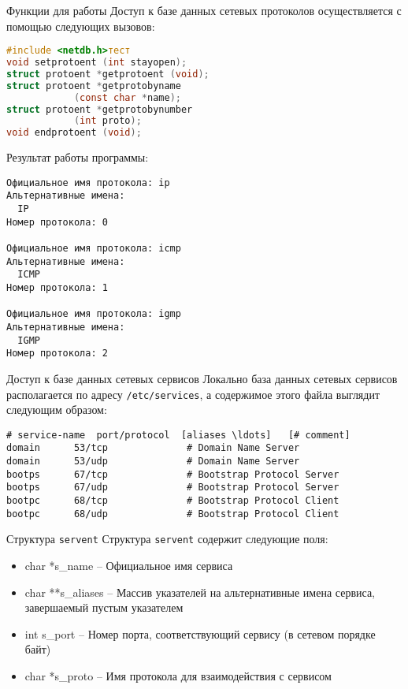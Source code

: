 \begin{frame}[fragile]{Функции для работы}
Доступ к базе данных сетевых протоколов осуществляется с помощью следующих вызовов:
\scriptsize\begin{lstlisting}[language=C]
#include <netdb.h>тест
void setprotoent (int stayopen);
struct protoent *getprotoent (void);
struct protoent *getprotobyname 
            (const char *name);
struct protoent *getprotobynumber
			(int proto);
void endprotoent (void);
\end{lstlisting}
\end{frame}

\begin{frame}[fragile]
\tiny
\end{frame}

\begin{frame}[fragile]{}
Результат работы программы:
\scriptsize\begin{verbatim}
Официальное имя протокола: ip
Альтернативные имена:
  IP
Номер протокола: 0

Официальное имя протокола: icmp
Альтернативные имена:
  ICMP
Номер протокола: 1

Официальное имя протокола: igmp
Альтернативные имена:
  IGMP
Номер протокола: 2
\end{verbatim}
\normalsize
\end{frame}

\begin{frame}[fragile]{Доступ к базе данных сетевых сервисов}
Локально база данных сетевых сервисов располагается по адресу {\tt /etc/services}, а содержимое этого файла выглядит следующим образом:
\scriptsize\begin{verbatim}
# service-name  port/protocol  [aliases \ldots]   [# comment]
domain		53/tcp				# Domain Name Server
domain		53/udp				# Domain Name Server
bootps		67/tcp				# Bootstrap Protocol Server
bootps		67/udp				# Bootstrap Protocol Server
bootpc		68/tcp				# Bootstrap Protocol Client
bootpc		68/udp				# Bootstrap Protocol Client
\end{verbatim}
\end{frame}

\begin{frame}{Структура {\tt servent}}
Структура {\tt servent} содержит следующие поля:
\begin{itemize}
	\item char  *s\_name -- Официальное имя сервиса
	\item char **s\_aliases -- Массив указателей на альтернативные имена сервиса, завершаемый пустым указателем
	\item int    s\_port -- Номер порта, соответствующий сервису (в сетевом порядке байт)
	\item char  *s\_proto -- Имя протокола для взаимодействия с сервисом
\end{itemize}
\end{frame}

